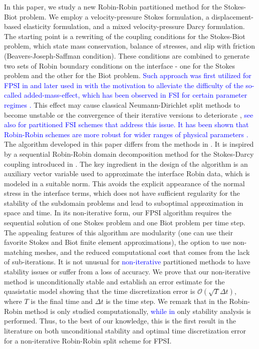 \documentclass[11pt]{article}
\begin{document}
In this paper, we study a new Robin-Robin partitioned method for the Stokes-Biot problem. We employ a velocity-pressure Stokes formulation, a displacement-based elasticity formulation, and a mixed velocity-pressure Darcy formulation. The starting point is a rewriting of the coupling conditions for the Stokes-Biot problem, which state mass conservation, balance of stresses, and slip with friction (Beavers-Joseph-Saffman condition). These conditions are combined to generate two sets of Robin boundary conditions on the interface - one for the Stokes problem and the other for the Biot problem. \textcolor{blue}{Such approach was first utilized for FPSI in \cite{bqq2009} and later used in \cite{Seboldt-etal-2021,pb2024} with the motivation to alleviate the difficulty of the so-called added-mass-effect, which has been observed in FSI for certain parameter regimes \cite{Causin-added-mass-effect}.}
This effect may cause classical Neumann-Dirichlet split methods to become unstable or the convergence of their iterative versions to deteriorate \cite{Causin-added-mass-effect,bqq2009}, \textcolor{blue}{see also \cite{Guidoboni-etal,Fernandez,Gig-Verg,Banks-etal,Lukacova-etal} for partitioned FSI schemes that address this issue.}
\textcolor{blue}{It has been shown that Robin-Robin schemes are more robust for wider ranges of physical parameters \cite{Badia-Robin-FSI,bqq2009}.} The algorithm developed in this paper differs from the methods in \cite{bqq2009,Seboldt-etal-2021,pb2024}. It is inspired by a sequential Robin-Robin domain decomposition method for the Stokes-Darcy coupling introduced in \cite{Disc-Quart-Valli-2007}.
The key ingredient in the design of the algorithm is an auxiliary vector variable used
to approximate the interface Robin data, which is modeled in a suitable norm. This avoids the explicit appearance of the normal stress in the interface terms, which does not have sufficient regularity for the stability of the subdomain problems and lead to suboptimal approximation in space and time. In its non-iterative form, our FPSI algorithm requires the sequential solution of one Stokes problem and one Biot problem per time step. The appealing features of this algorithm are modularity (one can use their favorite Stokes and Biot finite element approximations), the option to use non-matching meshes, and the reduced computational cost that comes from the lack of sub-iterations. It is not unusual for \textcolor{blue}{non-iterative} partitioned methods to have stability issues or suffer from a loss of accuracy. We prove that our non-iterative method is unconditionally stable and establish an error estimate for the quasistatic model showing that the time discretization error is $\mathcal{O}(\sqrt{T}\Delta t)$, where $T$ is the final time and $\Delta t$ is the time step.
We remark that in \cite{bqq2009} the Robin-Robin method is only studied computationally, \textcolor{blue}{while in \cite{Seboldt-etal-2021,pb2024}} only stability analysis is performed. Thus, to the best of our knowledge, this is the first result in the literature on both unconditional stability and optimal time discretization error for a non-iterative Robin-Robin split scheme for FPSI.
\end{document}
